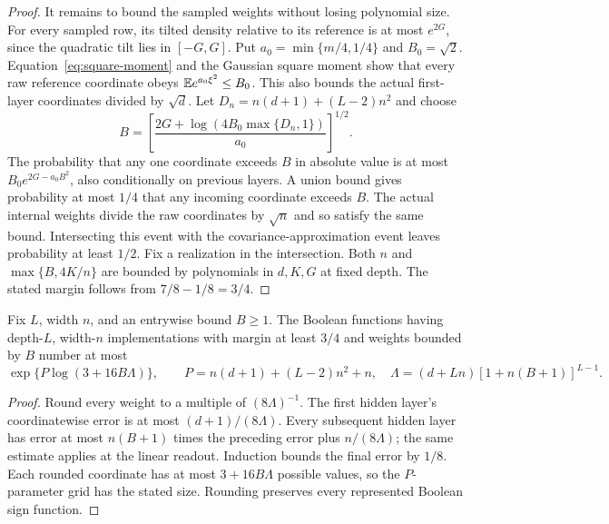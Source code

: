 \begin{proof}
It remains to bound the sampled weights without losing polynomial size.
For every sampled row, its tilted density relative to its reference
is at most $e^{2G}$, since the quadratic tilt lies in $[-G,G]$.
Put $a_0=\min\{m/4,1/4\}$ and $B_0=\sqrt2$.
Equation~\eqref{eq:square-moment} and the Gaussian square moment show
that every raw reference coordinate obeys $\mathbb E e^{a_0\xi^2}\leq B_0$.
This also bounds the actual first-layer coordinates divided by $\sqrt d$.
Let $D_n=n(d+1)+(L-2)n^2$ and choose
\[
 B=\left[\frac{2G+\log(4B_0\max\{D_n,1\})}{a_0}\right]^{1/2}.
\]
The probability that any one coordinate exceeds $B$ in absolute value
is at most $B_0e^{2G-a_0B^2}$, also conditionally on previous layers.
A union bound gives probability at most $1/4$ that any incoming coordinate
exceeds $B$. The actual internal weights divide the raw coordinates by
$\sqrt n$ and so satisfy the same bound. Intersecting this event with the
covariance-approximation event leaves probability at least $1/2$.
Fix a realization in the intersection. Both $n$ and
$\max\{B,4K/n\}$ are bounded by
polynomials in $d,K,G$ at fixed depth. The stated margin follows from $7/8-1/8=3/4$.
\end{proof}

\begin{lemma}\label{lem:tilt-count}
Fix $L$, width $n$, and an entrywise bound $B\geq1$. The Boolean functions
having depth-$L$, width-$n$ implementations with margin at least $3/4$ and
weights bounded by $B$ number at most
\[
 \exp\{P\log(3+16B\Lambda)\},\qquad
 P=n(d+1)+(L-2)n^2+n,
 \quad \Lambda=(d+Ln)[1+n(B+1)]^{L-1}.
\]
\end{lemma}
\begin{proof}
Round every weight to a multiple of $(8\Lambda)^{-1}$.
The first hidden layer's coordinatewise error is at most $(d+1)/(8\Lambda)$.
Every subsequent hidden layer has error at most $n(B+1)$ times the preceding
error plus $n/(8\Lambda)$; the same estimate applies at the linear readout.
Induction bounds the final error by $1/8$. Each rounded coordinate has at
most $3+16B\Lambda$ possible values, so the $P$-parameter grid has the stated
size. Rounding preserves every represented Boolean sign function.
\end{proof}
